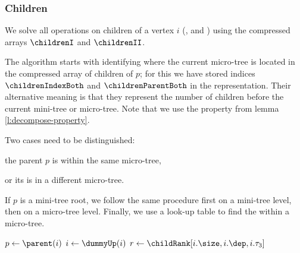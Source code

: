 \subsubsection{Children}

We solve all operations on children of a vertex $i$ (\degree{}, \childRank{} and \childSelect{}) using the compressed arrays $\childrenI$ and $\childrenII$.

\begin{algorithm}
\begin{algorithmic}
		\State {}
		\State {}
	\Else
		\State {}
	\EndIf
\EndFunction
\end{algorithmic}
\end{algorithm}

The \childRank{} algorithm starts with  identifying where the current micro-tree is located in the compressed array of children of $p$; for this we have stored indices $\childrenIndexBoth$ and $\childrenParentBoth$ in the representation.
Their alternative meaning is that they represent the number of children before the current mini-tree or micro-tree.
Note that we use the property from lemma \ref{l:decompose-property}.

Two cases need to be distinguished:
\begin{enuminline}
	\item the parent $p$ is within the same micro-tree,
	\item or its is in a different micro-tree.
\end{enuminline}
If $p$ is a mini-tree root, we follow the same procedure first on a mini-tree level, then on a micro-tree level.
Finally, we use a look-up table to find the \childRank{} within a micro-tree.

\begin{algorithm}
\begin{algorithmic}
	\State $p \gets \parent(i)$
	\State $i \gets \dummyUp(i)$ 
		\State {}
		 
			\State {}
		\Else {}
			\State {}
		\EndIf
		 
			 
				\State $r \gets \childRank[i.\size, i.\dep, i.\tau_3]$
				\State {}
			\Else {}
				\State {}
			\EndIf
		\Else {}
			\State {}
		\EndIf
	\Else
		\State {}
	\EndIf
\EndFunction
\end{algorithmic}
\end{algorithm}

